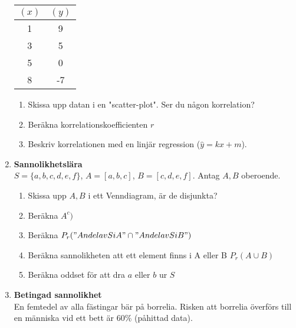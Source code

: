 \documentclass[a4paper,10pt]{article}
\begin{document}
\begin{enumerate}
{    \begin{table}
        \centering
        \begin{tabular}[H]{c|c}
        \textbf{$(x)$}  & \textbf{$(y)$}\\ \hline
        1                        & 9                           \\
        3                        & 5                           \\
        5                       & 0                           \\
        8                       & -7
        \end{tabular}
    \end{table}
  }
    \begin{enumerate}
        \item{Skissa upp datan i en "scatter-plot". Ser du någon korrelation?}
        \newpage
        \item{Beräkna korrelationskoefficienten $r$}
        \newpage
        \item{Beskriv korrelationen med en linjär regression ($\hat{y}=kx+m$).}
    \end{enumerate}
\newpage
    \item{{\bf Sannolikhetslära} \\ $S=\{a, b, c, d, e, f\}$, $A=[a, b, c]$, $B=[c, d, e, f]$. Antag $A, B$ oberoende.}
    \begin{enumerate}
        \item{Skissa upp $A, B$ i ett Venndiagram, är de disjunkta?}
        \vspace{6cm}
        \item{Beräkna $A^c)$}
        \vspace{3cm}
        \item{Beräkna $P_r("Andel av S i A" \cap "Andel av S i B")$}
        \vspace{3cm}
        \item{Beräkna sannolikheten att ett element finns i A eller B  $P_r(A \cup B)$}
        \vspace{3cm}
        \item{Beräkna oddset för att dra $a$ eller $b$ ur $S$}
    \end{enumerate}
    \newpage
    \item{{\bf Betingad sannolikhet}\\En femtedel av alla fästingar bär på borrelia. Risken att borrelia överförs till en människa vid ett bett är $60\%$ (påhittad data)}. \\

\end{enumerate}
\end{document}
